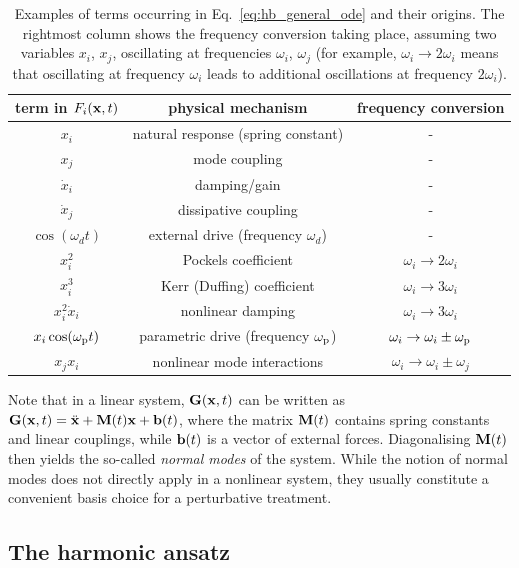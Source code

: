 \begin{table}[t] 
	\centering
	\caption{Examples of terms occurring in Eq.~\eqref{eq:hb_general_ode} and their origins. The rightmost column shows the frequency conversion taking place, assuming two variables $x_i$, $x_j$, oscillating at frequencies $\omega_i$, $\omega_j$ (for example, $\omega_i \rightarrow 2\omega_i$ means that oscillating at frequency $\omega_i$ leads to additional oscillations at frequency $2\omega_i$).}
	\label{table:hb_terms}
	\begin{tabular}{ |c|c|c| } 
		\hline
		term in $F_i(\vb{x}, t)$ & physical mechanism & frequency conversion \\ \hline
		$x_i$ & natural response (spring constant) & - \\
		$x_j$ & mode coupling & - \\
		$\dot{x}_i$ & damping/gain & -\\
		$\dot{x}_j$ & dissipative coupling & -\\
		$\cos(\omega_d t)$ & external drive (frequency $\omega_d$) & -\\
		$x_i^2$ & Pockels coefficient & $\omega_i \rightarrow 2\omega_i$ \\ 
		$x_i^3$ & Kerr (Duffing) coefficient & $\omega_i \rightarrow 3 \omega_i$ \\ 
		$x_i^2 \dot{x}_i$ & nonlinear damping & $\omega_i \rightarrow 3 \omega_i$\\ 
		$x_i \cos(\omega_{\rm p} t)$ & parametric drive (frequency $\omega_{\rm p}$) & $\omega_i \rightarrow \omega_i \pm \omega_{\rm p}$\\
		$x_j x_i $ & nonlinear mode interactions & $\omega_i \rightarrow \omega_i \pm \omega_j$\\ 
		\hline
	\end{tabular}
\end{table}

Note that in a linear system, $\vb{G}(\vb{x}, t)$ can be written as $\vb{G}(\vb{x}, t)= \ddot{\vb{x}} + \vb{M}(t) \vb{x}+ \textbf{b}(t)$, where the matrix $\vb{M}(t)$ contains spring constants and linear couplings, while $\vb{b}(t)$ is a vector of external forces. Diagonalising $\vb{M}(t)$ then yields the so-called \textit{normal modes} of the system. While the notion of normal modes does not directly apply in a nonlinear system, they usually constitute a convenient basis choice for a perturbative treatment.

\subsection{The harmonic ansatz}\label{sec:harm_exp}

